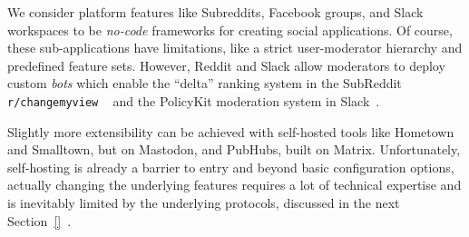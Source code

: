 We consider platform features like Subreddits, Facebook groups, and
Slack workspaces to be \emph{no-code} frameworks for creating social
applications.
Of course, these sub-applications have limitations,
like a strict user-moderator hierarchy
and predefined feature sets.
However, Reddit and Slack allow moderators to deploy
custom \emph{bots} which enable the
``delta'' ranking system in the SubReddit \texttt{r/changemyview}
~\cite{changemyview}
and the PolicyKit moderation system
in Slack~\cite{policykit}.


Slightly more extensibility can be achieved with self-hosted tools
like Hometown and Smalltown, but on Mastodon, and PubHubs, built on Matrix.
Unfortunately, self-hosting is already a barrier to entry and beyond
basic configuration options, actually changing the underlying features
requires a lot of technical expertise and is inevitably limited
by the underlying protocols, discussed in the next Section~\ref{}~\cite{
smalltown,runyourownsocial,pubhubs,pubhubsidentity
}.


